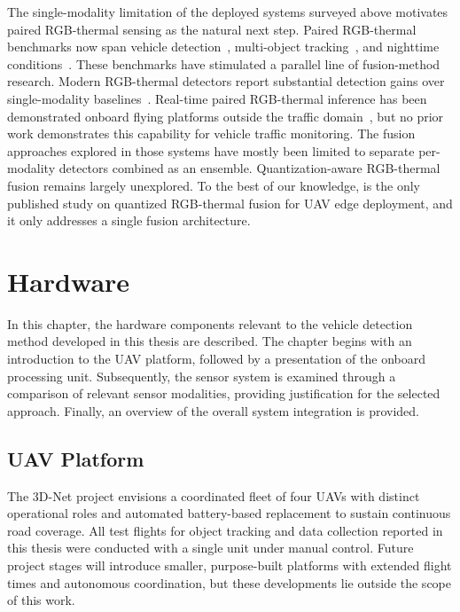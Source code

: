 \documentclass[12pt,oneside,bibtotoc,liststotoc]{scrbook}
\begin{document}
The single-modality limitation of the deployed systems surveyed above
motivates paired RGB-thermal sensing as the natural next step.
Paired RGB-thermal benchmarks now span vehicle
detection~\cite{suo2023hitUAVDataset,sun2022droneVehicleRGBThermalUAVDataset},
multi-object tracking~\cite{zhang2022VTUAVDataset,nie2025m3ot}, and nighttime
conditions~\cite{zhang2024trafficNightDataset,feng2023rtdodDataset}. These
benchmarks have stimulated a parallel line of fusion-method research. Modern
RGB-thermal detectors report substantial detection gains over single-modality
baselines~\cite{qingyun2021CFT,yuan2024c2former,guo2024damsdet,wan2025yolov11rgbt,li2025DEPFusionUAVMultispectralObjectDetection}.
Real-time paired RGB-thermal inference has been demonstrated onboard flying
platforms outside the traffic
domain~\cite{speth2022deepLearningRGBThermalOnboardDrone,bultmann2021realTimeMultiModalSemanticFusion},
but no prior work demonstrates this capability for vehicle traffic monitoring.
The fusion approaches explored in those systems have mostly been limited to separate
per-modality detectors combined as an ensemble. Quantization-aware RGB-thermal fusion remains largely
unexplored. To the best of our knowledge,
\citet{kafka2025EarlyFusionQuantizedModels} is the only published study on
quantized RGB-thermal fusion for UAV edge deployment, and it only addresses a
single fusion architecture.


\chapter{Hardware}
\label{chap:hardware}

In this chapter, the hardware components relevant to the vehicle
detection method developed in this thesis are described. The
chapter begins with an
introduction to the UAV platform, followed by a presentation of
the onboard processing unit. Subsequently, the sensor system is
examined through a comparison of relevant sensor modalities,
providing justification for the selected approach. Finally, an
overview of the overall system integration is provided.

\vspace{-2em}
\section{UAV Platform}
\vspace{-0.5em}

The 3D-Net project envisions a coordinated fleet of four UAVs with distinct operational roles
and automated battery-based replacement to sustain continuous road coverage.
All test flights for object tracking and data collection reported in this thesis
were conducted with a single unit under manual control.
Future project stages will introduce smaller, purpose-built platforms with extended flight times
and autonomous coordination, but these developments lie outside the scope of this work.
\end{document}
